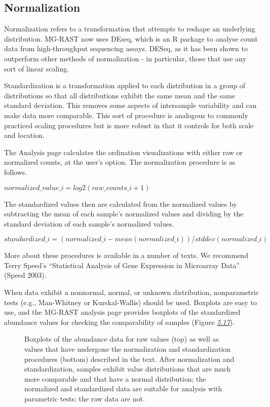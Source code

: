 \documentclass[letterpaper,10pt,english]{sphinxmanual}
\begin{document}
\subsection{Normalization}
\label{\detokenize{user_manual:normalization}}
Normalization refers to a transformation that attempts to reshape an
underlying distribution. MG-RAST now uses DEseq, which is an R package
to analyse count data from high-throughput sequencing assays. DESeq, as
it has been shown to outperform other methods of normalization - in
particular, those that use any sort of linear scaling.

Standardization is a transformation applied to each distribution in a
group of distributions so that all distributions exhibit the same mean
and the same standard deviation. This removes some aspects of
intersample variability and can make data more comparable. This sort of
procedure is analogous to commonly practiced scaling procedures but is
more robust in that it controls for both scale and location.

The Analysis page calculates the ordination visualizations with either
raw or normalized counts, at the user’s option. The normalization
procedure is as follows.

\(normalized\_value\_i = log2(raw\_counts\_i + 1)\)

The standardized values then are calculated from the normalized values
by subtracting the mean of each sample’s normalized values and dividing
by the standard deviation of each sample’s normalized values.

\(standardized\_i = (normalized\_i - mean(normalized\_i)) / stddev(normalized\_i)\)

More about these procedures is available in a number of texts. We
recommend Terry Speed’s “Statistical Analysis of Gene Expression in
Microarray Data” (Speed 2003).

When data exhibit a nonnormal, normal, or unknown distribution,
nonparametric tests (e.g., Man-Whitney or Kurskal-Wallis) should be
used. Boxplots are easy to use, and the MG-RAST analysis page provides
boxplots of the standardized abundance values for checking the
comparability of samples (Figure {\hyperref[\detokenize{user_manual:fig:boxplots}]{\emph{5.17}}}).

\begin{figure}[htbp]
\centering
\capstart

\noindent{}
\caption{Boxplots of the abundance data for raw values (top) as well as values
that have undergone the normalization and standardization procedures
(bottom) described in the text. After normalization and
standardization, samples exhibit value distributions that are much
more comparable and that have a normal distribution; the normalized
and standardized data are suitable for analysis with parametric
tests; the raw data are not.}\label{\detokenize{user_manual:fig-boxplots}}\end{figure}
\end{document}

